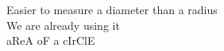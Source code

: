 \documentclass[preview]{standalone}
\begin{document}
Easier to measure a diameter than a radius\\We are already using it\\aReA oF a cIrClE\\
\end{document}
